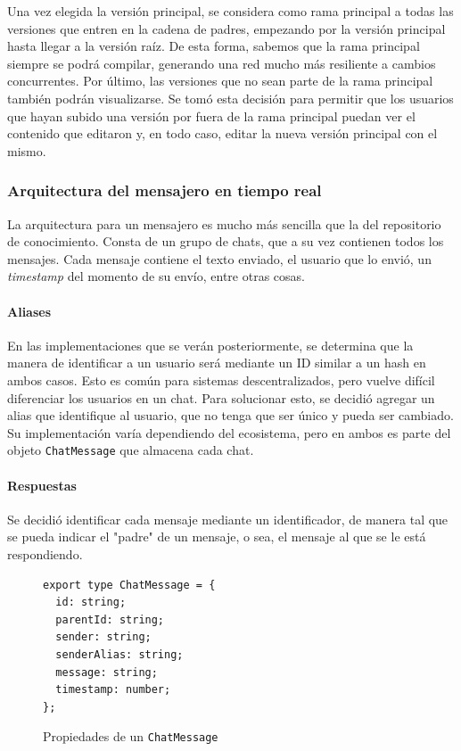 Una vez elegida la versión principal, se considera como rama principal a todas las versiones que entren en la cadena de padres, empezando por la versión principal hasta llegar a la versión raíz. De esta forma, sabemos que la rama principal siempre se podrá compilar, generando una red mucho más resiliente a cambios concurrentes. 
Por último, las versiones que no sean parte de la rama principal también podrán visualizarse. Se tomó esta decisión para permitir que los usuarios que hayan subido una versión por fuera de la rama principal puedan ver el contenido que editaron y, en todo caso, editar la nueva versión principal con el mismo.

\subsubsection{Arquitectura del mensajero en tiempo real}

La arquitectura para un mensajero es mucho más sencilla que la del repositorio de conocimiento. Consta de un grupo de chats, que a su vez contienen todos los mensajes. Cada mensaje contiene el texto enviado, el usuario que lo envió, un \textit{timestamp} del momento de su envío, entre otras cosas.

\paragraph{Aliases} En las implementaciones que se verán posteriormente, se determina que la manera de identificar a un usuario será mediante un ID similar a un hash en ambos casos. Esto es común para sistemas descentralizados, pero vuelve difícil diferenciar los usuarios en un chat. Para solucionar esto, se decidió agregar un alias que identifique al usuario, que no tenga que ser único y pueda ser cambiado. Su implementación varía dependiendo del ecosistema, pero en ambos es parte del objeto \texttt{ChatMessage} que almacena cada chat.

\paragraph{Respuestas} Se decidió identificar cada mensaje mediante un identificador, de manera tal que se pueda indicar el "padre" de un mensaje, o sea, el mensaje al que se le está respondiendo.

\begin{figure}[H]
    \centering
    \begin{minipage}{0.9\linewidth}
        \lstset{
            basicstyle=\ttfamily\small,
            frame=single,
            captionpos=b
        }
        \begin{lstlisting}
export type ChatMessage = {
  id: string;
  parentId: string;
  sender: string;
  senderAlias: string;
  message: string;
  timestamp: number;
};\end{lstlisting}
    \end{minipage}
    \caption{Propiedades de un \texttt{ChatMessage}}
    \label{fig:chat-message}
\end{figure}